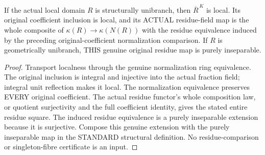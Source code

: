 \begin{theorem}
\label{algebra:domain-geometric-unibranch-residue-map}
If the actual local domain $R$ is structurally unibranch, then
$\overline R^{\,K}$ is local. Its original coefficient inclusion
is local, and its ACTUAL residue-field map is the whole composite
of $\kappa(R)\to\kappa(N(R))$ with the residue equivalence
induced by the preceding original-coefficient normalization
comparison. If $R$ is geometrically unibranch, THIS genuine
original residue map is purely inseparable.
\leanok
\end{theorem}
\begin{proof}
Transport localness through the genuine normalization ring equivalence.
The original inclusion is integral and injective into the actual
fraction field; integral unit reflection makes it local. The
normalization equivalence preserves EVERY original coefficient.
The actual residue functor's whole composition law, or quotient
surjectivity and the full coefficient identity, gives the stated
entire residue square. The induced residue equivalence is a purely
inseparable extension because it is surjective. Compose this genuine
extension with the purely inseparable map in the STANDARD structural
definition. No residue-comparison or singleton-fibre certificate is
an input.
\end{proof}

